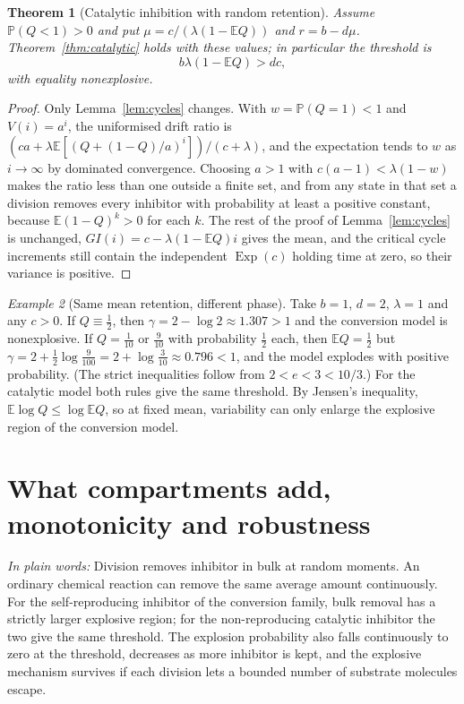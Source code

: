 \documentclass[11pt,a4paper]{article}
\numberwithin{equation}{section}
\newtheorem{theorem}{Theorem}[section]
\theoremstyle{definition}\newtheorem{definition}[theorem]{Definition}
\theoremstyle{remark}\newtheorem{remark}[theorem]{Remark}\newtheorem{example}[theorem]{Example}
\newcommand{\E}{\mathbb E}
\renewcommand{\P}{\mathbb P}
\newcommand{\Exp}{\operatorname{Exp}}
\newcommand{\takeaway}[1]{\par\smallskip\noindent\textit{In plain words:} #1\par\smallskip}
\begin{document}
\begin{theorem}[Catalytic inhibition with random retention]\label{thm:randomQ-cat}
Assume $\P(Q<1)>0$ and put $\mu=c/(\lambda(1-\E Q))$ and $r=b-d\mu$. Theorem~\ref{thm:catalytic} holds with these values; in particular the threshold is
\begin{equation}\label{eq:randomQ-cat}
b\lambda(1-\E Q)>dc ,
\end{equation}
with equality nonexplosive.
\end{theorem}

\begin{proof}
Only Lemma~\ref{lem:cycles} changes. With $w=\P(Q=1)<1$ and $V(i)=a^i$, the uniformised drift ratio is $(ca+\lambda\E[(Q+(1-Q)/a)^i])/(c+\lambda)$, and the expectation tends to $w$ as $i\to\infty$ by dominated convergence. Choosing $a>1$ with $c(a-1)<\lambda(1-w)$ makes the ratio less than one outside a finite set, and from any state in that set a division removes every inhibitor with probability at least a positive constant, because $\E(1-Q)^k>0$ for each $k$. The rest of the proof of Lemma~\ref{lem:cycles} is unchanged, $GI(i)=c-\lambda(1-\E Q)i$ gives the mean, and the critical cycle increments still contain the independent $\Exp(c)$ holding time at zero, so their variance is positive.
\end{proof}

\begin{example}[Same mean retention, different phase]\label{ex:samemean}
Take $b=1$, $d=2$, $\lambda=1$ and any $c>0$. If $Q\equiv\tfrac12$, then $\gamma=2-\log2\approx1.307>1$ and the conversion model is nonexplosive. If $Q=\tfrac1{10}$ or $\tfrac9{10}$ with probability $\tfrac12$ each, then $\E Q=\tfrac12$ but $\gamma=2+\tfrac12\log\tfrac9{100}=2+\log\tfrac3{10}\approx0.796<1$, and the model explodes with positive probability. (The strict inequalities follow from $2<e<3<10/3$.) For the catalytic model both rules give the same threshold. By Jensen's inequality, $\E\log Q\le\log\E Q$, so at fixed mean, variability can only enlarge the explosive region of the conversion model.
\end{example}
\section{What compartments add, monotonicity and robustness}\label{sec:compare}
\takeaway{Division removes inhibitor in bulk at random moments. An ordinary chemical reaction can remove the same average amount continuously. For the self-reproducing inhibitor of the conversion family, bulk removal has a strictly larger explosive region; for the non-reproducing catalytic inhibitor the two give the same threshold. The explosion probability also falls continuously to zero at the threshold, decreases as more inhibitor is kept, and the explosive mechanism survives if each division lets a bounded number of substrate molecules escape.}
\end{document}
